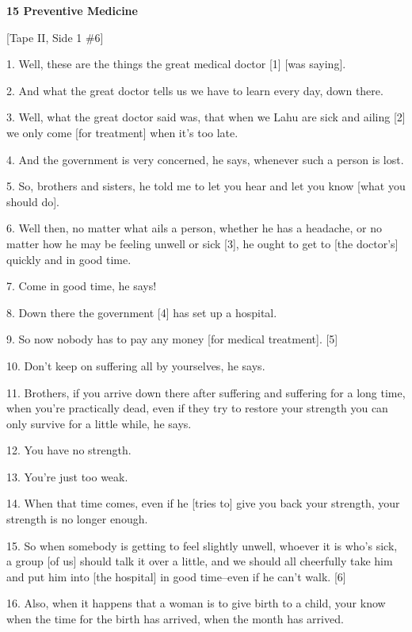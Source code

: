 
{\Large{}\textbf{15 Preventive Medicine }}

{\Large{}[Tape II, Side 1 \#6]  }

{\Large{}1. Well, these are the things the great medical doctor [1] [was saying].
}

{\Large{}2. And what the great doctor tells us we have to learn every day, down
there. }

{\Large{}3. Well, what the great doctor said was, that when we Lahu are sick and
ailing [2] we only come [for treatment] when it's too late. }

{\Large{}4. And the government is very concerned, he says, whenever such a person
is lost. }

{\Large{}5. So, brothers and sisters, he told me to let you hear and let you know
[what you should do].}

{\Large{}6. Well then, no matter what ails a person, whether he has a headache,
or no matter how he may be feeling unwell or sick [3], he ought to get to [the
doctor's] quickly and in good time. }

{\Large{}7. Come in good time, he says! }

{\Large{}8. Down there the government [4] has set up a hospital. }

{\Large{}9. So now nobody has to pay any money [for medical treatment]. [5]}

{\Large{}10. Don't keep on suffering all by yourselves, he says. }

{\Large{}11. Brothers, if you arrive down there after suffering and suffering for
a long time, when you're practically dead, even if they try to restore your strength
you can only survive for a little while, he says. }

{\Large{}12. You have no strength. }

{\Large{}13. You're just too weak. }

{\Large{}14. When that time comes, even if he [tries to] give you back your strength,
your strength is no longer enough. }

{\Large{}15. So when somebody is getting to feel slightly unwell, whoever it is
who's sick, a group [of us] should talk it over a little, and we should all cheerfully
take him and put him into [the hospital] in good time--even if he can't walk. [6]
}

{\Large{}16. Also, when it happens that a woman is to give birth to a child, your
know when the time for the birth has arrived, when the month has arrived. }

